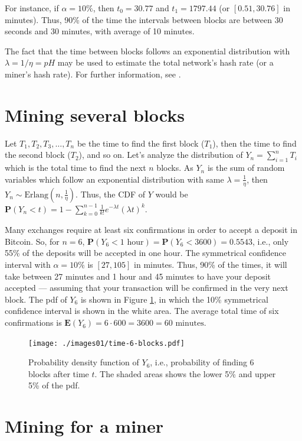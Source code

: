 For instance, if $\alpha = 10\%$, then $t_0 = 30.77$ and $t_1 = 1797.44$ (or $[0.51, 30.76]$ in minutes). Thus, 90\% of the time the intervals between blocks are between 30 seconds and 30 minutes, with average of 10 minutes.

The fact that the time between blocks follows an exponential distribution with $\lambda = 1/\eta = pH$ may be used to estimate the total network's hash rate (or a miner's hash rate). For further information, see \cite{ozisikestimation}.


\section{Mining several blocks}

Let $T_1, T_2, T_3, \dots, T_n$ be the time to find the first block ($T_1$), then the time to find the second block ($T_2$), and so on. Let's analyze the distribution of $Y_n = \sum_{i=1}^{n} T_i$ which is the total time to find the next $n$ blocks. As $Y_n$ is the sum of random variables which follow an exponential distribution with same $\lambda = \frac{1}{\eta}$, then $Y_n \sim \text{Erlang}(n, \frac{1}{\eta})$. Thus, the CDF of $Y$ would be $\mathbf{P}(Y_n < t) = 1 - \sum_{k=0}^{n-1} \frac{1}{k!} e^{-\lambda t} (\lambda t)^k$.

Many exchanges require at least six confirmations in order to accept a deposit in Bitcoin. So, for $n=6$, $\mathbf{P}(Y_6 < 1 \text{ hour}) = \mathbf{P}(Y_6 < 3600) = 0.5543$, i.e., only 55\% of the deposits will be accepted in one hour. The symmetrical confidence interval with $\alpha=10\%$ is $[27, 105]$ in minutes. Thus, 90\% of the times, it will take between 27 minutes and 1 hour and 45 minutes to have your deposit accepted --- assuming that your transaction will be confirmed in the very next block. The pdf of $Y_6$ is shown in Figure \ref{fig-bitcoin-time-6-blocks}, in which the 10\% symmetrical confidence interval is shown in the white area. The average total time of six confirmations is $\mathbf{E}(Y_6) = 6 \cdot 600 = 3600 = 60 \text{ minutes}$.

\begin{figure}[ht]
\centering\texttt{[image: ./images01/time-6-blocks.pdf]}
\caption{Probability density function of $Y_6$, i.e., probability of finding 6 blocks after time $t$. The shaded areas shows the lower 5\% and upper 5\% of the pdf.\label{fig-bitcoin-time-6-blocks}}
\end{figure}

\section{Mining for a miner}

